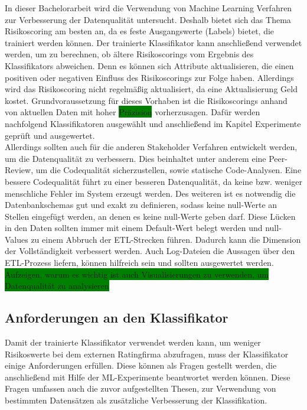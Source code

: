 In dieser Bachelorarbeit wird die Verwendung von Machine Learning Verfahren zur Verbesserung der Datenqualität untersucht.
Deshalb bietet sich das Thema Risikoscoring am besten an, da es feste Ausgangswerte (Labels) bietet, die trainiert werden können.
Der trainierte Klassifikator kann anschließend verwendet werden, um zu berechnen, ob ältere Risikoscorings vom Ergebnis des Klassifikators abweichen.
Denn es können sich Attribute aktualisieren, die einen positiven oder negativen Einfluss des Risikoscorings zur Folge haben. 
Allerdings wird das Risikoscoring nicht regelmäßig aktualisiert, da eine Aktualisierung Geld kostet.
Grundvoraussetzung für dieses Vorhaben ist die Risikoscorings anhand von aktuellen Daten mit hoher \colorbox{green}{Präzision} vorherzusagen. 
Dafür werden nachfolgend Klassifikatoren ausgewählt und anschließend im Kapitel Experimente geprüft und ausgewertet.\\
Allerdings sollten auch für die anderen Stakeholder Verfahren entwickelt werden, um die Datenqualität zu verbessern.
Dies beinhaltet unter anderem eine Peer-Review, um die Codequalität sicherzustellen, sowie statische Code-Analysen.
Eine bessere Codequalität führt zu einer besseren Datenqualität, da keine bzw. weniger menschliche Fehler im System erzeugt werden.
Des weiteren ist es notwendig die Datenbankschemas gut und exakt zu definieren, sodass keine null-Werte an Stellen eingefügt werden, an denen es keine null-Werte geben darf.
Diese Lücken in den Daten sollten immer mit einem Default-Wert belegt werden und null-Values zu einem Abbruch der ETL-Strecken führen.
Dadurch kann die Dimension der Vollständigkeit verbessert werden.
Auch Log-Dateien die Aussagen über den ETL-Prozess liefern, können hilfreich sein und sollten ausgewertet werden.
\colorbox{green}{Aufzeigen, warum es wichtig ist auch Visualisierungen zu verwenden, um Datenqualität zu analysieren}

\subsection{Anforderungen an den Klassifikator}
Damit der trainierte Klassifikator verwendet werden kann, um weniger Risikoswerte bei dem externen Ratingfirma abzufragen, muss der Klassifikator einige Anforderungen erfüllen.
Diese können als Fragen gestellt werden, die anschließend mit Hilfe der ML-Experimente beantwortet werden können. 
Diese Fragen umfassen auch die zuvor aufgestellten Thesen, zur Verwendung von bestimmten Datensätzen als zusätzliche Verbesserung der Klassifikation. 

